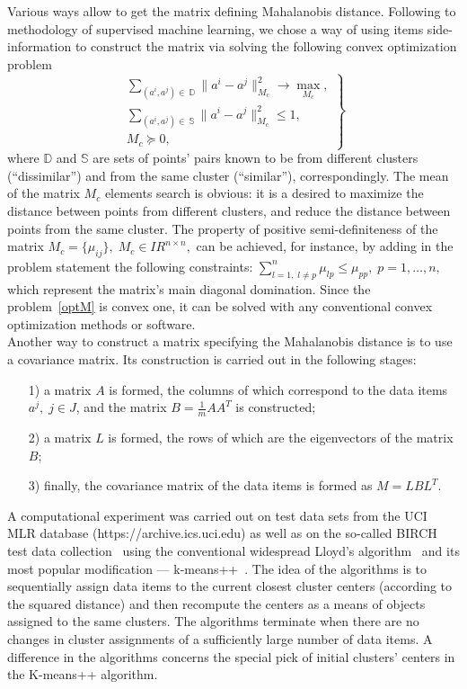 \documentclass[12pt]{llncs}
\begin{document}
Various ways allow to get the matrix defining Mahalanobis distance. Following to methodology of supervised machine learning, we chose a way of using items side-information to construct the matrix via solving the following convex optimization problem
\begin{equation}
\left.
\begin{array}{c}
\sum\limits_{(a^i\!,a^j)\in \:\mathbb D}\|a^i-a^j\|^2_{M_c}\rightarrow\max\limits_{M_c},\\
\sum\limits_{(a^i\!,a^j)\in \:\mathbb S}\|a^i-a^j\|^2_{M_c}\leq 1,\\
M_c\succeq 0,
\end{array}\right\} \label{optM}
\end{equation}
where $\mathbb D$ and $\mathbb S$ are  sets of  points' pairs known to be from different clusters (“dissimilar”) and from the same cluster (“similar”), correspondingly. The mean of the matrix $M_c$ elements search is obvious: it is a desired to maximize the distance between points from different clusters, and reduce the distance between points from the same cluster. 
The property of positive semi-definiteness of the matrix $M_c=\{\mu_{ij}\},\;M_c\in I\!\! R^{n\times n},$ can be achieved, for instance, by adding in the problem statement the following constraints:
$
\!\!\displaystyle\sum\limits_{{l=1},\;{l\neq p}}^{n}\mu_{lp}\leq\mu_{pp},\;p=1,\ldots,n,
$ %
 which represent the matrix's main diagonal domination. 
Since the problem~\eqref{optM} is convex one, it can be solved with any
conventional convex optimization methods or software.\\

Another way to construct a matrix specifying the Mahalanobis distance is to use a covariance matrix. Its construction is carried out in the following stages:
\begin{itemize}
\item[1) ]
a matrix $A$ is formed, the columns of which correspond to the data items $a^j,\;j\in J$, and the matrix $B=\frac 1 m AA^T$ is constructed;

\item[2) ]
a matrix $L$ is formed, the rows of which are the eigenvectors of the matrix $B$;
\item[3) ]
 finally, the covariance matrix of the data items is formed as $M=LBL^T$.

\end{itemize}


A computational experiment was carried out on test data sets from the UCI MLR database (https://archive.ics.uci.edu) as well as on the so-called BIRCH test data collection~\cite{4GS} using
the conventional widespread Lloyd’s
algorithm~\cite{1GS} and its most popular modification --- k-means++~\cite{2GS}.
The idea of the algorithms is to sequentially assign data items to the current closest cluster centers (according to the squared distance) and then recompute the centers as a means of objects assigned to the same clusters. The algorithms terminate when there are no changes in cluster assignments of a sufficiently large number of data items. A difference in the algorithms concerns the special pick of initial clusters' centers in the K-means++  algorithm.
\end{document}
